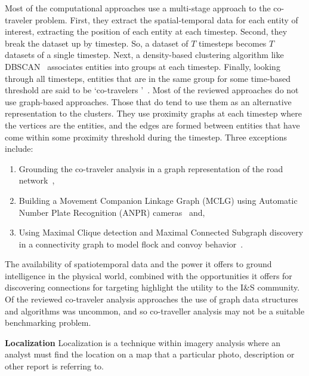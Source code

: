 Most of the computational approaches use a multi-stage approach to the co-traveler problem. 
First, they extract the spatial-temporal data for each entity of interest, extracting the position of each entity at each timestep. 
Second, they break the dataset up by timestep. 
So, a dataset of $T$ timesteps becomes $T$ datasets of a single timestep. 
Next, a density-based clustering algorithm like DBSCAN~\cite{Ester1996} associates entities into groups at each timestep. 
Finally, looking through all timesteps, entities that are in the same group for some time-based threshold are said to be `co-travelers '~\cite {Tritsarolis2021}.
Most of the reviewed approaches do not use graph-based approaches. 
Those that do tend to use them as an alternative representation to the clusters. 
They use proximity graphs at each timestep where the vertices are the entities, and the edges are formed between entities that have come within some proximity threshold during the timestep.
Three exceptions include: 
\begin{enumerate}
    \item Grounding the co-traveler analysis in a graph representation of the road network~\cite{Tang2014}, 
    \item Building a Movement Companion Linkage Graph (MCLG) using Automatic Number Plate Recognition (ANPR) cameras~\cite{Wang2016a} and, 
    \item Using Maximal Clique detection and Maximal Connected Subgraph discovery in a connectivity graph to model flock and convoy behavior~\cite{Tritsarolis2021}.
\end{enumerate}

The availability of spatiotemporal data and the power it offers to ground intelligence in the physical world, combined with the opportunities it offers for discovering connections for targeting highlight the utility to the I\&S community. 
Of the reviewed co-traveler analysis approaches the use of graph data structures and algorithms was uncommon, and so co-traveller analysis may not be a suitable benchmarking problem.

\textbf{Localization}
Localization is a technique within imagery analysis where an analyst must find the location on a map that a particular photo, description or other report is referring to. 

